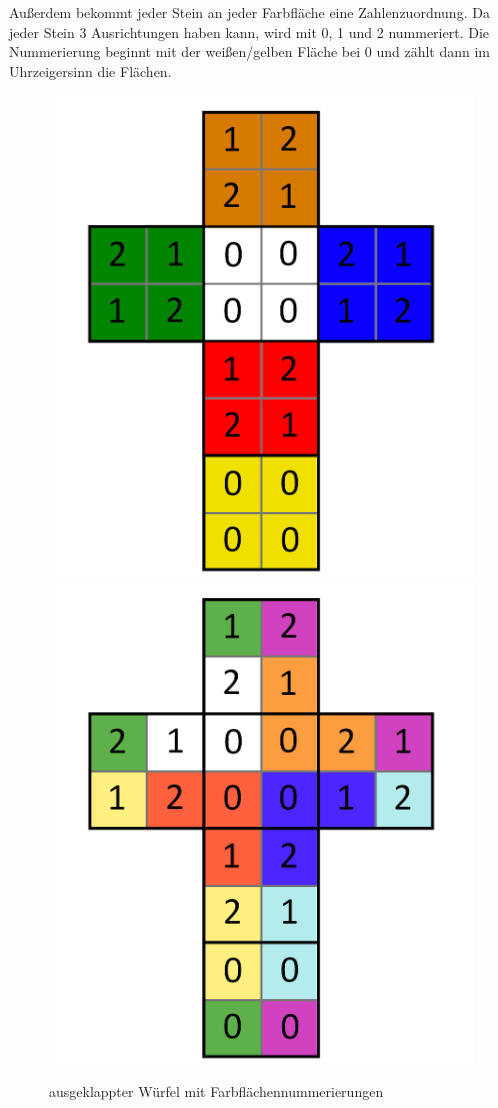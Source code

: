 \documentclass[12pt,a4paper, usenames, dvipsnames]{article}
\begin{document}
Außerdem bekommt jeder Stein an jeder Farbfläche eine Zahlenzuordnung. Da jeder Stein 3 Ausrichtungen haben kann, wird mit 0, 1 und 2 nummeriert. Die Nummerierung beginnt mit der weißen/gelben Fläche bei 0 und zählt dann im Uhrzeigersinn die Flächen. 
\begin{figure}[h]
\centering
\includegraphics[scale=0.1]{foldedout_012.png}
\includegraphics[scale=0.1]{foldedout_c_012.png}
\caption{ausgeklappter Würfel mit Farbflächennummerierungen}
\end{figure}
\end{document}
